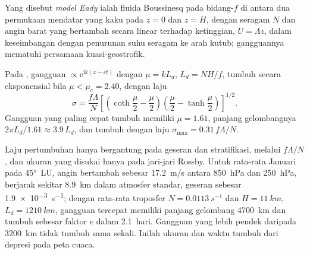 \begin{definition}\label{def:b3:atmospheric-dynamics:eady}
Yang disebut \emph{model Eady} ialah fluida Boussinesq pada
bidang-$f$ di antara dua permukaan mendatar yang kaku pada $z = 0$ dan $z = H$, dengan
 seragam $N$ dan angin barat yang bertambah secara linear
terhadap ketinggian, $U = \Lambda z$, dalam keseimbangan  dengan penurunan suhu
seragam ke arah kutub; gangguannya mematuhi
persamaan kuasi-geostrofik.
\end{definition}

\begin{theorem}\label{thm:b3:atmospheric-dynamics:eady}
Pada , gangguan $\propto \mathrm e^{\mathrm ik(x - ct)}$
dengan $\mu = kL_d$, $L_d = NH/f$, tumbuh secara eksponensial bila $\mu < \mu_c =
2.40$, dengan laju
\[
\sigma = \frac{f\Lambda}{N}\left[\left(\coth\frac{\mu}{2} - \frac{\mu}{2}\right)\left(\frac{\mu}{2} - \tanh\frac{\mu}{2}\right)\right]^{1/2} .
\]
Gangguan yang paling cepat tumbuh memiliki $\mu = 1.61$, panjang gelombangnya $2\pi L_d/1.61
\approx 3.9\,L_d$, dan tumbuh dengan laju $\sigma_{\max} = 0.31\,f\Lambda/N$.
\end{theorem}
\admitted

Laju pertumbuhan hanya bergantung pada geseran dan stratifikasi, melalui
$f\Lambda/N$, dan ukuran yang disukai hanya pada jari-jari Rossby. Untuk
rata-rata Januari pada \ang{45}~LU, angin bertambah sebesar \qty{17.2}{m/s} antara
\qty{850}{hPa} dan \qty{250}{hPa}, berjarak sekitar \qty{8.9}{km} dalam
atmosfer standar, geseran sebesar \qty{1.9e-3}{s^{-1}}; dengan rata-rata
troposfer $N = \qty{0.0113}{s^{-1}}$ dan $H = \qty{11}{km}$, $L_d =
\qty{1210}{km}$, gangguan tercepat memiliki panjang gelombang \qty{4700}{km}
dan tumbuh sebesar faktor $e$ dalam \num{2.1}~hari. Gangguan yang lebih pendek daripada
\qty{3200}{km} tidak tumbuh sama sekali. Inilah ukuran dan waktu tumbuh
dari depresi pada peta cuaca.


